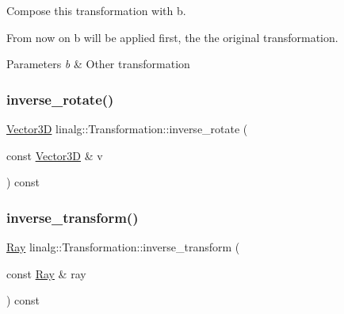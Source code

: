 Compose this transformation with b. 

From now on b will be applied first, the the original transformation. 
\begin{DoxyParams}{Parameters}
{\em b} & Other transformation \\
\hline
\end{DoxyParams}
\mbox{\label{classlinalg_1_1Transformation_a412bea080940292e3b5789e8397fd444}} 
\subsubsection{\texorpdfstring{inverse\_rotate()}{inverse\_rotate()}}
{\footnotesize\ttfamily \mbox{\hyperlink{classVector3D}{Vector3D}} linalg\+::\+Transformation\+::inverse\+\_\+rotate (\begin{DoxyParamCaption}\item[{const \mbox{\hyperlink{classVector3D}{Vector3D}} \&}]{v }\end{DoxyParamCaption}) const}

\mbox{\label{classlinalg_1_1Transformation_a00d24e4118b1a4390ba56950051f2d73}} 
\subsubsection{\texorpdfstring{inverse\_transform()}{inverse\_transform()}\hspace{0.1cm}{\footnotesize\ttfamily [1/2]}}
{\footnotesize\ttfamily \mbox{\hyperlink{classRay}{Ray}} linalg\+::\+Transformation\+::inverse\+\_\+transform (\begin{DoxyParamCaption}\item[{const \mbox{\hyperlink{classRay}{Ray}} \&}]{ray }\end{DoxyParamCaption}) const}

\mbox{\label{classlinalg_1_1Transformation_a96c21a4793a2d3c2801100d0cb15d894}} 
